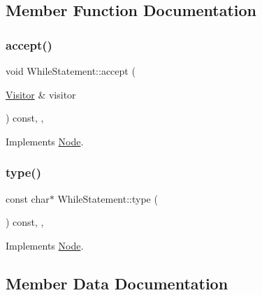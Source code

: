 \subsection{Member Function Documentation}
\mbox{\label{struct_while_statement_a017a8824abdcb5551061dae2a09e8ead}} 
\subsubsection{\texorpdfstring{accept()}{accept()}}
{\footnotesize\ttfamily void While\+Statement\+::accept (\begin{DoxyParamCaption}\item[{\hyperlink{struct_visitor}{Visitor} \&}]{visitor }\end{DoxyParamCaption}) const\hspace{0.3cm}{\ttfamily [inline]}, {\ttfamily [override]}, {\ttfamily [virtual]}}



Implements \hyperlink{struct_node_a10bd7af968140bbf5fa461298a969c71}{Node}.

\mbox{\label{struct_while_statement_a4e5965e91f9cca73ffa70ca14d7fd123}} 
\subsubsection{\texorpdfstring{type()}{type()}}
{\footnotesize\ttfamily const char$\ast$ While\+Statement\+::type (\begin{DoxyParamCaption}{ }\end{DoxyParamCaption}) const\hspace{0.3cm}{\ttfamily [inline]}, {\ttfamily [override]}, {\ttfamily [virtual]}}



Implements \hyperlink{struct_node_a82f29420d0a38efcc370352528e94e9b}{Node}.



\subsection{Member Data Documentation}
\mbox{\label{struct_while_statement_adcb2abe56520e643ad7b1192099c75e6}} 
